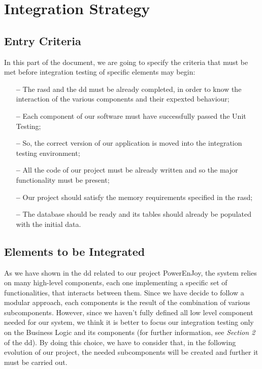 \section{Integration Strategy} \label{sec:intstra}

\subsection{Entry Criteria}

In this part of the document, we are going to specify the criteria that must be met before integration testing of specific elements may begin:

\begin{itemize}

\item[\textbf{--}] The \acl{rasd} and the \acl{dd} must be already completed, in order to know the interaction of the various components and their expexted behaviour;

\item[\textbf{--}] Each component of our software must have successfully passed the Unit Testing;

\item[\textbf{--}] So, the correct version of our application is moved into the integration testing environment;

\item[\textbf{--}] All the code of our project must be already written and so the major functionality must be present;

\item[\textbf{--}] Our project should satisfy the memory requirements specified in the \acs{rasd};

\item[\textbf{--}] The database should be ready and its tables should already be populated with the initial data.

\end{itemize}

\subsection{Elements to be Integrated}

As we have shown in the \acl{dd} related to our project PowerEnJoy, the system relies on many high-level components, each one implementing a specific set of functionalities, that interacts between them.
Since we have decide to follow a modular approach, each components is the result of the combination of various subcomponents.
However, since we haven't fully defined all low level component needed for our system, we think it is better to focus our integration testing only on the Business Logic and its components (for further information, see \textit{Section 2} of the \acl{dd}). By doing this choice, we have to consider that, in the following evolution of our project, the needed subcomponents will be created and further \acl{it} must be carried out.
 
